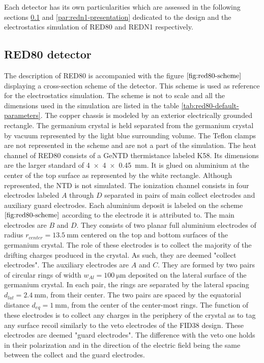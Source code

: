 Each detector has its own particularities which are assessed in the following sections \ref{par:red80-presentation} and \ref{par:redn1-presentation} dedicated to the design and the electrostatics simulation of RED80 and REDN1 respectively.


\subsection{RED80 detector}
\label{par:red80-presentation}

The description of RED80 is accompanied with the figure $\ref{fig:red80-scheme}$ displaying a cross-section scheme of the detector. This scheme is used as reference for the electrostatics simulation. The scheme is not to scale and all the dimensions used in the simulation are listed in the table \ref{tab:red80-default-parameters}.
The copper chassis is modeled by an exterior electrically grounded rectangle. The germanium crystal is held separated from the germanium crystal by vacuum represented by the light blue surrounding volume.
The Teflon clamps are not represented in the scheme and are not a part of the simulation.
The heat channel of RED80 consists of a GeNTD thermistance labeled K58. Its dimensions are the larger \Edelweiss{} standard of \SI{4 x 4 x 0.45}{\mm}. It is glued on aluminium at the center of the top surface as represented by the white rectangle. Although represented, the NTD is not simulated.
The ionization channel consists in four electrodes labeled $A$ through $D$ separated in pairs of main collect electrodes and auxiliary guard electrodes. Each aluminium deposit is labeled on the scheme $\ref{fig:red80-scheme}$ according to the electrode it is attributed to.
The main electrodes are $B$ and $D$. They consists of two planar full aluminium electrodes of radius $r_{center} = \SI{13.5}{\mm}$ centered on the top and bottom surfaces of the germanium crystal. The role of these electrodes is to collect the majority of the drifting charges produced in the crystal. As such, they are deemed "collect electrodes".
The auxiliary electrodes are $A$ and $C$. They are formed by two pairs of circular rings of width $w_{Al}=\SI{100}{\micro\meter}$ deposited on the lateral surface of the germanium crystal. In each pair, the rings are separated by the lateral spacing $d_{lat}=\SI{2.4}{\mm}$, from their center. The two pairs are spaced by the equatorial distance $d_{eq} = \SI{1}{\mm}$, from the center of the center-most rings. The function of these electrodes is to collect any charges in the periphery of the crystal as to tag any surface recoil similarly to the veto electrodes of the FID38 design. These electrodes are deemed "guard electrodes". The difference with the veto one holds in their polarization and in the direction of the electric field being the same between the collect and the guard electrodes.
